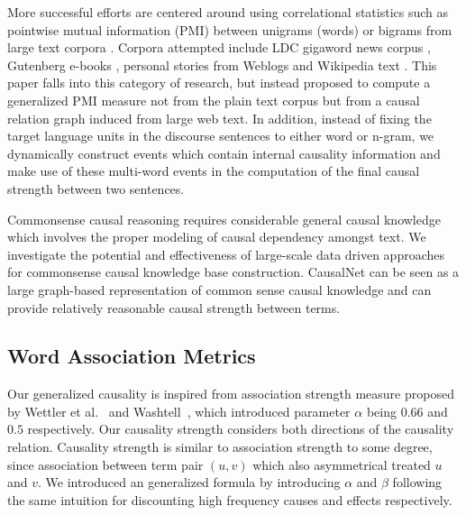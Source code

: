 More successful efforts are centered around using correlational
statistics \cite{gordon2012copa} such as pointwise mutual
information (PMI) between unigrams (words) or bigrams from large
text corpora \cite{Mihalcea2006:CKM}. Corpora attempted include LDC
gigaword news corpus \cite{goodwin2012utdhlt}, Gutenberg e-books
\cite{roemmele2011choice}, personal stories from Weblogs
\cite{gordon2011commonsense} and Wikipedia text
\cite{jabeen2014exploiting}.
This paper falls into this category
of research, but instead proposed to compute a generalized PMI
measure \cite{Washtell09:CWW} not from the plain text corpus but
from a causal relation graph induced from large web text. In
addition, instead of fixing the target language units in the
discourse sentences to either word or n-gram, we dynamically
construct events which contain internal causality information and
make use of these multi-word events in the computation of the final
causal strength between two sentences.

Commonsense causal reasoning requires considerable general causal
knowledge which involves the proper modeling of causal dependency amongst text.
We investigate the potential and effectiveness of large-scale data driven
approaches for commonsense causal knowledge base construction.
CausalNet can be seen as a large graph-based representation of common sense
causal knowledge and can provide relatively reasonable causal strength
between terms.

\subsection{Word Association Metrics}
Our generalized causality is inspired from association strength
measure proposed by Wettler et al.~\cite{Wettler:1993} and Washtell~\cite{Washtell09:CWW},
which introduced parameter $\alpha$ being $0.66$ and $0.5$ respectively.
Our causality strength considers both directions of the causality
relation. Causality strength is similar to
association strength to some degree, since association between term pair $(u,v)$ which also asymmetrical treated $u$ and $v$. We introduced an generalized
formula by introducing $\alpha$ and $\beta$ following the same intuition
for discounting high frequency causes and effects respectively.

